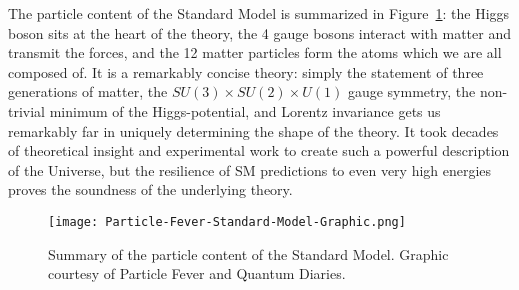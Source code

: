 The particle content of the Standard Model is summarized in Figure~\ref{fig:sm:summary}: the Higgs boson sits at the heart of the theory, the 4 gauge bosons interact with matter and transmit the forces, and the 12 matter particles form the atoms which we are all composed of. It is a remarkably concise theory: simply the statement of three generations of matter, the $SU(3)\times SU(2)\times U(1)$ gauge symmetry, the non-trivial minimum of the Higgs-potential, and Lorentz invariance gets us remarkably far in uniquely determining the shape of the theory. It took decades of theoretical insight and experimental work to create such a powerful description of the Universe, but the resilience of SM predictions to even very high energies proves the soundness of the underlying theory. 


\begin{figure}
\centering
\texttt{[image: Particle-Fever-Standard-Model-Graphic.png]}
\label{fig:sm:summary}
\caption{Summary of the particle content of the Standard Model. Graphic courtesy of Particle Fever and Quantum Diaries.}
\end{figure}

